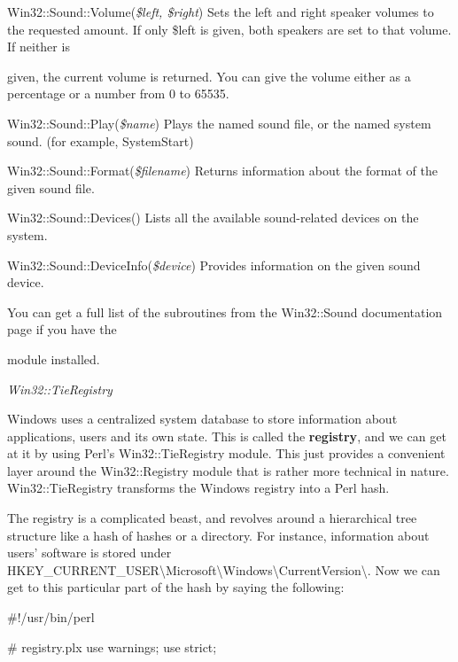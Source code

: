 \documentclass[a4paper,11pt]{book}
\begin{document}
\noindent 

\noindent Win32::Sound::Volume(\textit{\$left, \$right}) Sets the left and right speaker volumes to the requested amount. If only \$left is given, both speakers are set to that volume. If neither is

\noindent given, the current volume is returned. You can give the volume either as a percentage or a number from 0 to 65535.

\noindent Win32::Sound::Play(\textit{\$name}) Plays the named sound file, or the named system sound. (for example, SystemStart)

\noindent Win32::Sound::Format(\textit{\$filename}) Returns information about the format of the given sound file.

\noindent Win32::Sound::Devices() Lists all the available sound-related devices on the system.

\noindent Win32::Sound::DeviceInfo(\textit{\$device}) Provides information on the given sound device.

\noindent 

\noindent You can get a full list of the subroutines from the Win32::Sound documentation page if you have the

\noindent module installed.

\noindent 

\noindent \textit{Win32::TieRegistry}

\noindent Windows uses a centralized system database to store information about applications, users and its own state. This is called the \textbf{registry}, and we can get at it by using Perl's Win32::TieRegistry module. This just provides a convenient layer around the Win32::Registry module that is rather more technical in nature. Win32::TieRegistry transforms the Windows registry into a Perl hash.

\noindent 

\noindent The registry is a complicated beast, and revolves around a hierarchical tree structure like a hash of hashes or a directory. For instance, information about users' software is stored under HKEY\_CURRENT\_USER\textbackslash Microsoft\textbackslash Windows\textbackslash CurrentVersion\textbackslash . Now we can get to this particular part of the hash by saying the following:

\noindent 

\noindent \#!/usr/bin/perl

\noindent \# registry.plx use warnings; use strict;
\end{document}
